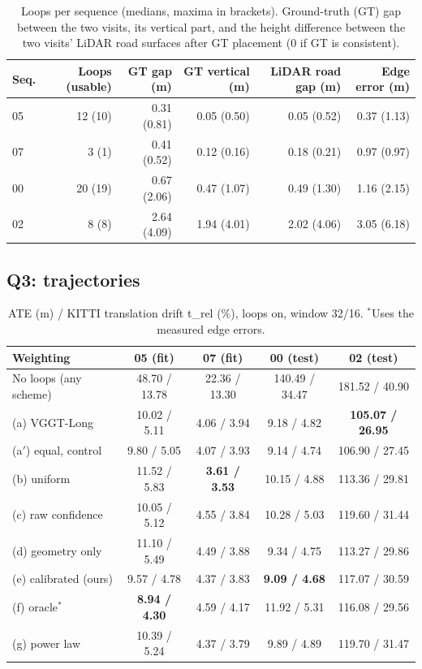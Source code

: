 \documentclass[11pt, a4paper]{article}
\begin{document}
\begin{table}[!htbp]
\centering
\caption{Loops per sequence (medians, maxima in brackets). Ground-truth (GT) gap between the two visits, its vertical
part, and the height difference between the two visits' LiDAR road surfaces after GT placement (0 if GT is consistent).}
\label{tab:loops}
\small
\begin{tabular}{lrrrrr}
\toprule
Seq. & Loops (usable) & GT gap (m) & GT vertical (m) & LiDAR road gap (m) & Edge error (m) \\
\midrule
05 & 12 (10) & 0.31 (0.81) & 0.05 (0.50) & 0.05 (0.52) & 0.37 (1.13) \\
07 &  3 (1)  & 0.41 (0.52) & 0.12 (0.16) & 0.18 (0.21) & 0.97 (0.97) \\
00 & 20 (19) & 0.67 (2.06) & 0.47 (1.07) & 0.49 (1.30) & 1.16 (2.15) \\
02 &  8 (8)  & 2.64 (4.09) & 1.94 (4.01) & 2.02 (4.06) & 3.05 (6.18) \\
\bottomrule
\end{tabular}
\end{table}

\subsection{Q3: trajectories}

\begin{table}[!htbp]
\centering
\caption{ATE (m) / KITTI translation drift t\_rel (\%), loops on, window 32/16. $^*$Uses the measured edge errors.}
\label{tab:traj}
\small
\begin{tabular}{lcccc}
\toprule
Weighting & 05 (fit) & 07 (fit) & 00 (test) & 02 (test) \\
\midrule
No loops (any scheme) & 48.70 / 13.78 & 22.36 / 13.30 & 140.49 / 34.47 & 181.52 / 40.90 \\
(a) VGGT-Long         & 10.02 / 5.11 & 4.06 / 3.94 & 9.18 / 4.82 & \textbf{105.07 / 26.95} \\
(a$'$) equal, control & 9.80 / 5.05 & 4.07 / 3.93 & 9.14 / 4.74 & 106.90 / 27.45 \\
(b) uniform           & 11.52 / 5.83 & \textbf{3.61 / 3.53} & 10.15 / 4.88 & 113.36 / 29.81 \\
(c) raw confidence    & 10.05 / 5.12 & 4.55 / 3.84 & 10.28 / 5.03 & 119.60 / 31.44 \\
(d) geometry only     & 11.10 / 5.49 & 4.49 / 3.88 & 9.34 / 4.75 & 113.27 / 29.86 \\
(e) calibrated (ours) & 9.57 / 4.78 & 4.37 / 3.83 & \textbf{9.09 / 4.68} & 117.07 / 30.59 \\
(f) oracle$^*$        & \textbf{8.94 / 4.30} & 4.59 / 4.17 & 11.92 / 5.31 & 116.08 / 29.56 \\
(g) power law         & 10.39 / 5.24 & 4.37 / 3.79 & 9.89 / 4.89 & 119.70 / 31.47 \\
\bottomrule
\end{tabular}
\end{table}
\end{document}
